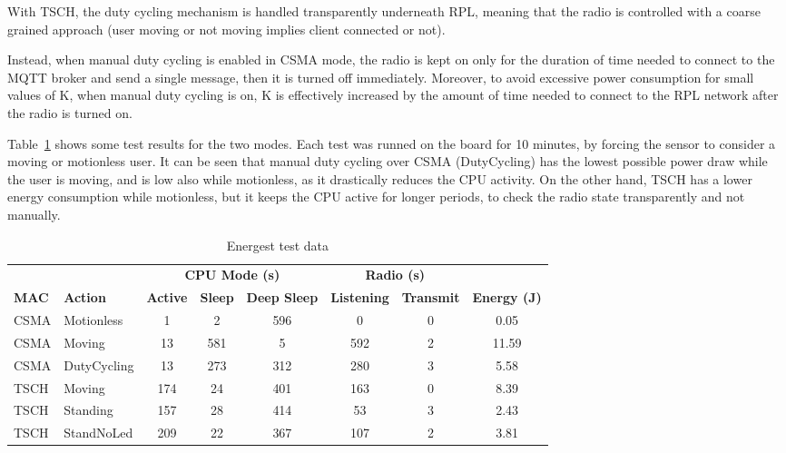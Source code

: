 \documentclass[a4paper, 10pt]{article}
\begin{document}
With TSCH, the duty cycling mechanism is handled transparently underneath RPL, meaning that the radio is controlled with a coarse grained approach (user moving or not moving implies client connected or not).

Instead, when manual duty cycling is enabled in CSMA mode, the radio is kept on only for the duration of time needed to  connect to the MQTT broker and send a single message, then it is turned  off immediately.
Moreover, to avoid excessive power consumption for small values of K, when manual duty cycling is on, K is effectively increased by the amount of  time needed to connect to the RPL network after the radio is turned on.

Table~\ref{table:energest} shows some test results for the two modes.
Each test was runned on the board for 10 minutes, by forcing the sensor to consider a moving or motionless user.
It can be seen that manual duty cycling over CSMA (DutyCycling) has the lowest possible power draw while the user is moving, and is low also while motionless, as it drastically reduces the CPU activity.
On the other hand, TSCH has a lower energy consumption while motionless, but it keeps the CPU active for longer periods, to check the radio state transparently and not manually.


\begin{table}[!htb]
\begin{tabular}{ll|ccc|cc|c}
& & \multicolumn{3}{c|}{ \textbf{CPU Mode (s)} } & \multicolumn{2}{c|}{ \textbf{Radio (s)} } & \\
\textbf{MAC} & \textbf{Action} & \textbf{Active} & \textbf{Sleep} & \textbf{Deep Sleep} & \textbf{Listening} & \textbf{Transmit} & \textbf{Energy (J)} \\
CSMA & Motionless & 1 & 2 & 596 & 0 & 0 & 0.05 \\
CSMA & Moving & 13 & 581 & 5 & 592 & 2 & 11.59 \\
CSMA & DutyCycling & 13 & 273 & 312 & 280 & 3 & 5.58 \\
TSCH & Moving & 174 & 24 & 401 & 163 & 0 & 8.39 \\
TSCH & Standing & 157 & 28 & 414 & 53 & 3 & 2.43 \\
TSCH & StandNoLed & 209 & 22 & 367 & 107 & 2 & 3.81 \\
\end{tabular}
\caption{Energest test data}
\label{table:energest}
\end{table}

\end{document}
